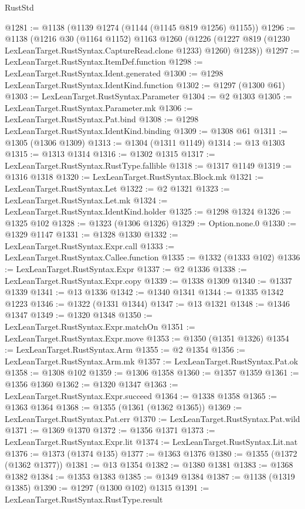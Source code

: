 \begin{lexlean}{RustStd}
\begin{coremodule}
{\begin{coremodule}
{{{{{{{{{{{{{{{{{{{{{{{{{{{{{{{{{{@1281 := @1138 (@1139 @1274 (@1144 (@1145 @819 @1256) @1155))
@1296 := @1138
    (@1216
      @30
      (@1164 @1152)
      @1163
      @1260
      (@1226 (@1227 @819 (@1230 LexLeanTarget.RustSyntax.CaptureRead.clone @1233) @1260) @1238))
@1297 := LexLeanTarget.RustSyntax.ItemDef.function
@1298 := LexLeanTarget.RustSyntax.Ident.generated
@1300 := @1298 LexLeanTarget.RustSyntax.IdentKind.function
@1302 := @1297 (@1300 @61)
@1303 := LexLeanTarget.RustSyntax.Parameter
@1304 := @2 @1303
@1305 := LexLeanTarget.RustSyntax.Parameter.mk
@1306 := LexLeanTarget.RustSyntax.Pat.bind
@1308 := @1298 LexLeanTarget.RustSyntax.IdentKind.binding
@1309 := @1308 @61
@1311 := @1305 (@1306 @1309)
@1313 := @1304 (@1311 @1149)
@1314 := @13 @1303
@1315 := @1313 @1314
@1316 := @1302 @1315
@1317 := LexLeanTarget.RustSyntax.RustType.fallible
@1318 := @1317 @1149
@1319 := @1316 @1318
@1320 := LexLeanTarget.RustSyntax.Block.mk
@1321 := LexLeanTarget.RustSyntax.Let
@1322 := @2 @1321
@1323 := LexLeanTarget.RustSyntax.Let.mk
@1324 := LexLeanTarget.RustSyntax.IdentKind.holder
@1325 := @1298 @1324
@1326 := @1325 @102
@1328 := @1323 (@1306 @1326)
@1329 := Option.none.{0}
@1330 := @1329 @1147
@1331 := @1328 @1330
@1332 := LexLeanTarget.RustSyntax.Expr.call
@1333 := LexLeanTarget.RustSyntax.Callee.function
@1335 := @1332 (@1333 @102)
@1336 := LexLeanTarget.RustSyntax.Expr
@1337 := @2 @1336
@1338 := LexLeanTarget.RustSyntax.Expr.copy
@1339 := @1338 @1309
@1340 := @1337 @1339
@1341 := @13 @1336
@1342 := @1340 @1341
@1344 := @1335 @1342 @1223
@1346 := @1322 (@1331 @1344)
@1347 := @13 @1321
@1348 := @1346 @1347
@1349 := @1320 @1348
@1350 := LexLeanTarget.RustSyntax.Expr.matchOn
@1351 := LexLeanTarget.RustSyntax.Expr.move
@1353 := @1350 (@1351 @1326)
@1354 := LexLeanTarget.RustSyntax.Arm
@1355 := @2 @1354
@1356 := LexLeanTarget.RustSyntax.Arm.mk
@1357 := LexLeanTarget.RustSyntax.Pat.ok
@1358 := @1308 @102
@1359 := @1306 @1358
@1360 := @1357 @1359
@1361 := @1356 @1360
@1362 := @1320 @1347
@1363 := LexLeanTarget.RustSyntax.Expr.succeed
@1364 := @1338 @1358
@1365 := @1363 @1364
@1368 := @1355 (@1361 (@1362 @1365))
@1369 := LexLeanTarget.RustSyntax.Pat.err
@1370 := LexLeanTarget.RustSyntax.Pat.wild
@1371 := @1369 @1370
@1372 := @1356 @1371
@1373 := LexLeanTarget.RustSyntax.Expr.lit
@1374 := LexLeanTarget.RustSyntax.Lit.nat
@1376 := @1373 (@1374 @135)
@1377 := @1363 @1376
@1380 := @1355 (@1372 (@1362 @1377))
@1381 := @13 @1354
@1382 := @1380 @1381
@1383 := @1368 @1382
@1384 := @1353 @1383
@1385 := @1349 @1384
@1387 := @1138 (@1319 @1385)
@1390 := @1297 (@1300 @102) @1315
@1391 := LexLeanTarget.RustSyntax.RustType.result
}}}}}}}}}}}}}}}}}}}}}}}}}}}}}}}}}}
\end{coremodule}}
\end{coremodule}
\end{lexlean}
